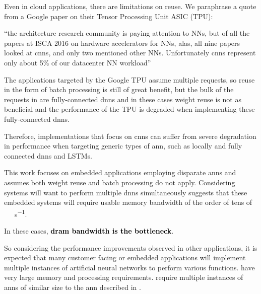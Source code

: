 \iffalse
We believe a system can be designed with \ac{dram} as the primary processing store. This will require careful use of data structures to describe storage within \ac{dram} to ensure we make good use of the potential bandwidth. But there are other benefits we will take advantage of, but more about that later.
\fi

\iffalse
There important application is disparate \ac{ann}s because specifically a form of \ac{dnn}, Convolutional Neural networks (\ac{cnn}) have gotten good press recently, but they are not the only \ac{dnn}.
\fi

Even in cloud applications, there are limitations on reuse. We paraphrase a quote from a Google paper \cite{jouppi2017datacenter} on their Tensor Processing Unit ASIC (TPU):

\hyphenquote{american}{the architecture research community is paying attention to NNs, but of all the papers at ISCA 2016 on hardware accelerators for NNs, alas, all nine papers looked at \ac{cnn}s, and only two mentioned other NNs. Unfortunately \ac{cnn}s represent only about 5\% of our datacenter NN workload}

The applications targeted by the Google TPU \cite{jouppi2017datacenter} assume multiple requests, so reuse in the form of batch processing is still of great benefit, but the bulk of the requests in \cite{jouppi2017datacenter} are fully-connected \ac{dnn}s and in these cases weight reuse is not as beneficial and the performance of the TPU is degraded when implementing these fully-connected \ac{dnn}s.

Therefore, implementations that focus on \ac{cnn}s can suffer from severe degradation in performance when targeting generic types of \ac{ann}, such as locally and fully connected \ac{dnn}s and LSTMs.

This work focuses on embedded applications employing disparate \ac{ann}s and assumes both weight reuse and batch processing do not apply.
Considering systems will want to perform multiple \ac{dnn}s simultaneously suggests that these embedded systems will require usable memory bandwidth of the order of tens of \SI[per-mode=symbol]{}{\tera \bit \per \second}.

In these cases, \textbf{\textcolor{black}{\ac{dram} bandwidth is the bottleneck}}.
\fi


\iffalse

\iffalse
So considering the performance improvements observed in other applications, it is expected that many customer facing or embedded applications will implement multiple instances of artificial neural networks to perform various functions.
have very large memory and processing requirements.
require multiple instances of \ac{ann}s of similar size to the \ac{ann} described in \cite{krizhevsky2012imagenet}.


